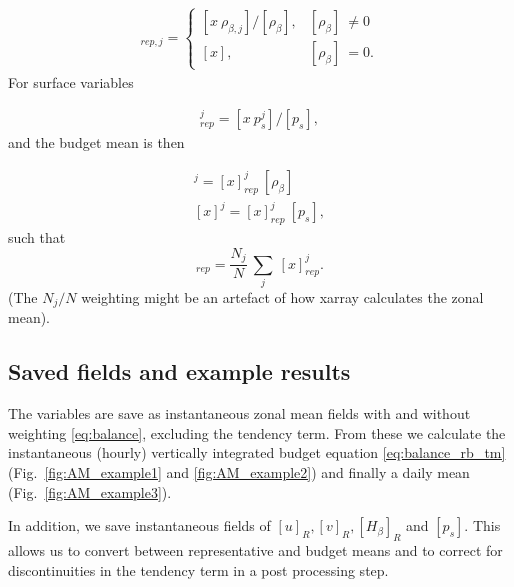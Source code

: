\documentclass[11pt]{article}
\numberwithin{equation}{section}
\newcommand{\beq}{\begin{equation}}
\newcommand{\eeq}{\end{equation}}
\begin{document}
\begin{align}
[x]_{rep,j} = \begin{cases}  
      [ x ~\rho_{\beta,j} ] /  [  \rho_\beta ]  , &  [  \rho_\beta ]  ~ \ne 0  \\
      [ x ] , & [  \rho_\beta ]  ~= 0.
    \end{cases} 
\end{align}
For surface variables

\begin{align}
[x]_{rep}^j = 
      [ x ~p_{s}^j ] /  [  p_s ] ,
\end{align}
%
and the budget mean is then

\begin{align}
[x]^{j}  = [x]_{rep}^j~   [  \rho_\beta ]  \\
[x]^{j}  = [x]_{rep}^j~   [  p_s ] , 
\end{align}
such that 
\beq
[x]_{rep} =\frac{N_j}{N} ~\sum_j ~[x]_{rep}^j .
\eeq
(The $N_j/N$ weighting might be an artefact of how xarray calculates the zonal mean).


\subsection{Saved fields and example results}
The variables are save as instantaneous zonal mean fields with and without weighting \eqref{eq:balance}, excluding the tendency term. From these we calculate the instantaneous (hourly) vertically integrated budget equation \eqref{eq:balance_rb_tm} (Fig.~\ref{fig:AM_example1} and \ref{fig:AM_example2}) and finally a daily mean (Fig.~\ref{fig:AM_example3}).\par

In addition, we save instantaneous fields of  $[u]_R, [v]_R,  [H_\beta]_R$ and $[p_s]$. This allows us to convert between representative and budget means and to correct for discontinuities in the tendency term in a post processing step. 

\end{document}
